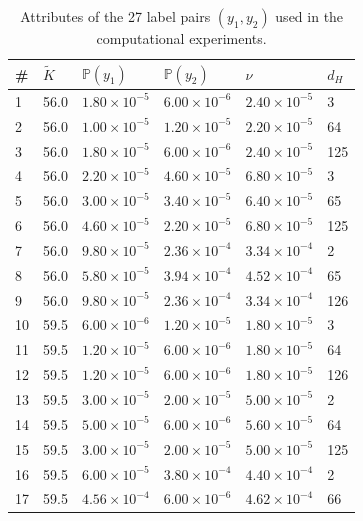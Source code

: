 \documentclass[pmlr]{jmlr} %
\begin{document}
\begin{table}[htbp]
  \centering
  \small
  \caption{Attributes of the 27 label pairs $(y_1, y_2)$ used in the computational experiments.}
  \label{tab:pairs}
  \begin{tabular}{llllll}
    \toprule
    \# & $\tilde{K}$ & $\mathbb{P}(y_1)$ & $\mathbb{P}(y_2)$ & $\nu$ & $d_H$ \\
    \midrule
     1 & 56.0 & $1.80\times10^{-5}$ & $6.00\times10^{-6}$ & $2.40\times10^{-5}$ &   3 \\
     2 & 56.0 & $1.00\times10^{-5}$ & $1.20\times10^{-5}$ & $2.20\times10^{-5}$ &  64 \\
     3 & 56.0 & $1.80\times10^{-5}$ & $6.00\times10^{-6}$ & $2.40\times10^{-5}$ & 125 \\
     4 & 56.0 & $2.20\times10^{-5}$ & $4.60\times10^{-5}$ & $6.80\times10^{-5}$ &   3 \\
     5 & 56.0 & $3.00\times10^{-5}$ & $3.40\times10^{-5}$ & $6.40\times10^{-5}$ &  65 \\
     6 & 56.0 & $4.60\times10^{-5}$ & $2.20\times10^{-5}$ & $6.80\times10^{-5}$ & 125 \\
     7 & 56.0 & $9.80\times10^{-5}$ & $2.36\times10^{-4}$ & $3.34\times10^{-4}$ &   2 \\
     8 & 56.0 & $5.80\times10^{-5}$ & $3.94\times10^{-4}$ & $4.52\times10^{-4}$ &  65 \\
     9 & 56.0 & $9.80\times10^{-5}$ & $2.36\times10^{-4}$ & $3.34\times10^{-4}$ & 126 \\
    \midrule
    10 & 59.5 & $6.00\times10^{-6}$ & $1.20\times10^{-5}$ & $1.80\times10^{-5}$ &   3 \\
    11 & 59.5 & $1.20\times10^{-5}$ & $6.00\times10^{-6}$ & $1.80\times10^{-5}$ &  64 \\
    12 & 59.5 & $1.20\times10^{-5}$ & $6.00\times10^{-6}$ & $1.80\times10^{-5}$ & 126 \\
    13 & 59.5 & $3.00\times10^{-5}$ & $2.00\times10^{-5}$ & $5.00\times10^{-5}$ &   2 \\
    14 & 59.5 & $5.00\times10^{-5}$ & $6.00\times10^{-6}$ & $5.60\times10^{-5}$ &  64 \\
    15 & 59.5 & $3.00\times10^{-5}$ & $2.00\times10^{-5}$ & $5.00\times10^{-5}$ & 125 \\
    16 & 59.5 & $6.00\times10^{-5}$ & $3.80\times10^{-4}$ & $4.40\times10^{-4}$ &   2 \\
    17 & 59.5 & $4.56\times10^{-4}$ & $6.00\times10^{-6}$ & $4.62\times10^{-4}$ &  66 \\

\end{tabular}
\end{table}
\end{document}
